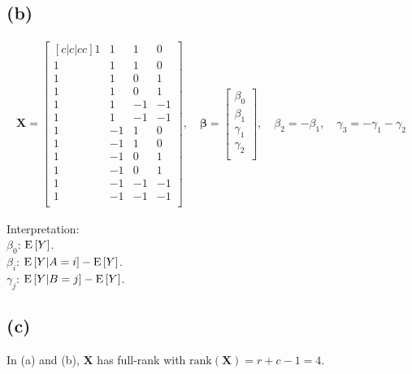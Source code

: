 \subsection*{(b)}
\begin{align*}
\bm{X} = 
\begin{bmatrix}[c|c|cc]
1 & 1 & 1 & 0\\
1 & 1 & 1 & 0\\
1 & 1 & 0 & 1\\
1 & 1 & 0 & 1\\
1 & 1 & -1 & -1\\
1 & 1 & -1 & -1\\
\hline
1 & -1 & 1 & 0\\
1 & -1 & 1 & 0\\
1 & -1 & 0 & 1\\
1 & -1 & 0 & 1\\
1 & -1 & -1 & -1\\
1 & -1 & -1 & -1\\
\end{bmatrix}
, \quad
\bm{\beta} =
\begin{bmatrix}
\beta_{0}\\
\beta_{1}\\
\gamma_{1}\\
\gamma_{2}\\
\end{bmatrix}
, \quad
\beta_{2} = -\beta_{1}
, \quad
\gamma_{3} = -\gamma_{1} -\gamma_{2}
\end{align*}

Interpretation:\\
$\beta_0$: $\mathrm{E}\left[Y\right]$.\\
$\beta_{i}$: $\mathrm{E}\left[Y|A = i\right] - \mathrm{E}\left[Y\right]$.\\
$\gamma_{j}$: $\mathrm{E}\left[Y|B = j\right] - \mathrm{E}\left[Y\right]$.\\

\subsection*{(c)}
In (a) and (b), $\bm{X}$ has full-rank with $\mathrm{rank}(\bm{X}) = r+c-1 = 4$.